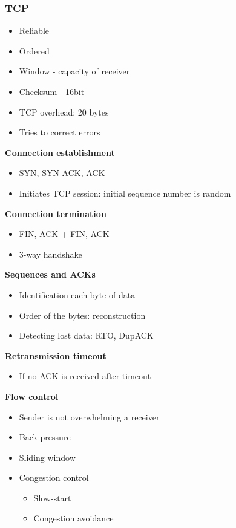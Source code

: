 \subsubsection{TCP}
\begin{itemize}
    \item Reliable
    \item Ordered
    \item Window - capacity of receiver
    \item Checksum - 16bit
    \item TCP overhead: 20 bytes
    \item Tries to correct errors
\end{itemize}
\textbf{Connection establishment}
\begin{itemize}
    \item SYN, SYN-ACK, ACK
    \item Initiates TCP session: initial sequence number is random
\end{itemize}
\textbf{Connection termination}
\begin{itemize}
    \item FIN, ACK + FIN, ACK
    \item 3-way handshake
\end{itemize}
\textbf{Sequences and ACKs}
\begin{itemize}
    \item Identification each byte of data
    \item Order of the bytes: reconstruction
    \item Detecting lost data: RTO, DupACK
\end{itemize}
\textbf{Retransmission timeout}
\begin{itemize}
    \item If no ACK is received after timeout
\end{itemize}
\textbf{Flow control}
\begin{itemize}
    \item Sender is not overwhelming a receiver
    \item Back pressure
    \item Sliding window
    \item Congestion control
    \begin{itemize}
        \item Slow-start
        \item Congestion avoidance
    \end{itemize}
\end{itemize}

